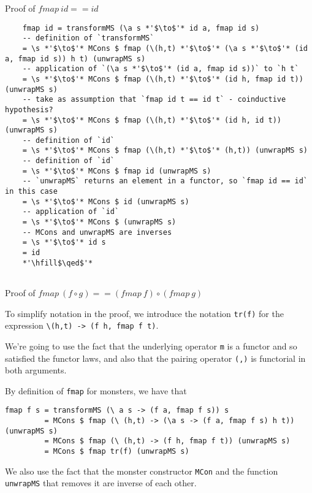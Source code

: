 \documentclass{article}
\begin{document}
Proof of $fmap\ id == id$\\

\begin{lstlisting}
	fmap id = transformMS (\a s *'$\to$'* id a, fmap id s)
	-- definition of `transformMS`
	= \s *'$\to$'* MCons $ fmap (\(h,t) *'$\to$'* (\a s *'$\to$'* (id a, fmap id s)) h t) (unwrapMS s)
	-- application of `(\a s *'$\to$'* (id a, fmap id s))` to `h t`
	= \s *'$\to$'* MCons $ fmap (\(h,t) *'$\to$'* (id h, fmap id t)) (unwrapMS s)
	-- take as assumption that `fmap id t == id t` - coinductive hypothesis?
	= \s *'$\to$'* MCons $ fmap (\(h,t) *'$\to$'* (id h, id t)) (unwrapMS s)
	-- definition of `id`
	= \s *'$\to$'* MCons $ fmap (\(h,t) *'$\to$'* (h,t)) (unwrapMS s)
	-- definition of `id`
	= \s *'$\to$'* MCons $ fmap id (unwrapMS s)
	-- `unwrapMS` returns an element in a functor, so `fmap id == id` in this case
	= \s *'$\to$'* MCons $ id (unwrapMS s)
	-- application of `id`
	= \s *'$\to$'* MCons $ (unwrapMS s)
	-- MCons and unwrapMS are inverses
	= \s *'$\to$'* id s 
	= id
	*'\hfill$\qed$'*
	
\end{lstlisting}
Proof of $fmap\ (f \circ g) == (fmap\ f) \circ (fmap\ g) $

To simplify notation in the proof, we introduce the notation \verb+tr(f)+ for the expression \verb+\(h,t) -> (f h, fmap f t)+.

We're going to use the fact that the underlying operator \verb+m+ is a functor and so satisfied the functor laws, and also that the pairing operator \verb+(,)+ is functorial in both arguments.

By definition of \verb+fmap+ for monsters, we have that
\begin{lstlisting}
fmap f s = transformMS (\ a s -> (f a, fmap f s)) s
         = MCons $ fmap (\ (h,t) -> (\a s -> (f a, fmap f s) h t)) (unwrapMS s)
         = MCons $ fmap (\ (h,t) -> (f h, fmap f t)) (unwrapMS s)
         = MCons $ fmap tr(f) (unwrapMS s)
\end{lstlisting}


We also use the fact that the monster constructor \verb+MCon+ and the function \verb+unwrapMS+ that removes it are inverse of each other.
\end{document}
